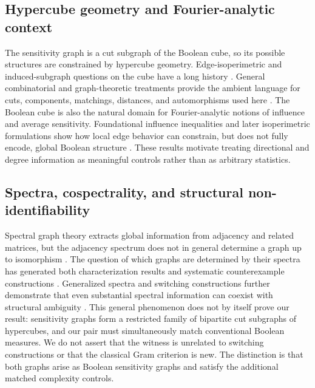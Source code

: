 \documentclass[twoside,12pt,letterpaper]{article}
\theoremstyle{definition}
\begin{document}
\subsection{Hypercube geometry and Fourier-analytic context}
The sensitivity graph is a cut subgraph of the Boolean cube, so its possible structures are constrained by hypercube geometry. Edge-isoperimetric and induced-subgraph questions on the cube have a long history \parencite{lindsey1964,harper1966,bernstein1967,hart1976,chung1988,bollobas1991,ellis2011}. General combinatorial and graph-theoretic treatments provide the ambient language for cuts, components, matchings, distances, and automorphisms used here \parencite{bollobas1986,diestel2017,lovasz2012}. The Boolean cube is also the natural domain for Fourier-analytic notions of influence and average sensitivity. Foundational influence inequalities and later isoperimetric formulations show how local edge behavior can constrain, but does not fully encode, global Boolean structure \parencite{kahn1988,bourgain1992,talagrand1994,friedgut1998,falik2007,odonnell2014}. These results motivate treating directional and degree information as meaningful controls rather than as arbitrary statistics.

\subsection{Spectra, cospectrality, and structural non-identifiability}
Spectral graph theory extracts global information from adjacency and related matrices, but the adjacency spectrum does not in general determine a graph up to isomorphism \parencite{cvetkovic1980,biggs1993,chung1997,godsil2001,cvetkovic2010,brouwer2012}. The question of which graphs are determined by their spectra has generated both characterization results and systematic counterexample constructions \parencite{schwenk1973,godsil1982,vandam2003,haemers2004,vandam2009}. Generalized spectra and switching constructions further demonstrate that even substantial spectral information can coexist with structural ambiguity \parencite{vandam2007,abiad2012,qiu2020}. This general phenomenon does not by itself prove our result: sensitivity graphs form a restricted family of bipartite cut subgraphs of hypercubes, and our pair must simultaneously match conventional Boolean measures. We do not assert that the witness is unrelated to switching constructions or that the classical Gram criterion is new. The distinction is that both graphs arise as Boolean sensitivity graphs and satisfy the additional matched complexity controls.
\end{document}
